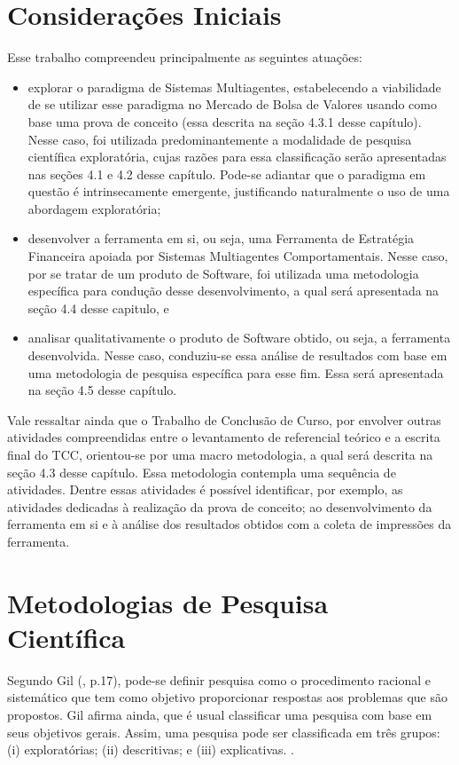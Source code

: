 \section{Considerações Iniciais}
Esse trabalho compreendeu principalmente as seguintes atuações:
\begin{itemize}
\item explorar o paradigma de Sistemas Multiagentes, estabelecendo a viabilidade de se utilizar esse paradigma no Mercado de Bolsa de Valores usando como base uma prova de conceito (essa descrita na seção 4.3.1 desse capítulo). Nesse caso, foi utilizada predominantemente a modalidade de pesquisa científica exploratória, cujas razões para essa classificação serão apresentadas nas seções 4.1 e 4.2 desse capítulo. Pode-se adiantar que o paradigma em questão é intrinsecamente emergente, justificando naturalmente o uso de uma abordagem exploratória;

\item desenvolver a ferramenta em si, ou seja, uma Ferramenta de Estratégia Financeira apoiada por Sistemas Multiagentes Comportamentais. Nesse caso, por se tratar de um produto de Software, foi utilizada uma metodologia específica para condução desse desenvolvimento, a qual será apresentada na seção 4.4 desse capitulo, e

\item analisar qualitativamente o produto de Software obtido, ou seja, a ferramenta desenvolvida. Nesse caso, conduziu-se essa análise de resultados com base em uma metodologia de pesquisa específica para esse fim. Essa será apresentada na seção 4.5 desse capítulo.
\end{itemize}

Vale ressaltar ainda que o Trabalho de Conclusão de Curso, por envolver outras atividades compreendidas entre o levantamento de referencial teórico e a escrita final do TCC, orientou-se por uma macro metodologia, a qual será descrita na seção 4.3 desse capítulo. Essa metodologia contempla uma sequência de atividades. Dentre essas atividades é possível identificar, por exemplo, as atividades dedicadas à realização da prova de conceito; ao desenvolvimento da ferramenta em si e à análise dos resultados obtidos com a coleta de impressões da ferramenta.

\section{Metodologias de Pesquisa Científica}

Segundo Gil (\citeyear{gil2002}, p.17), pode-se definir pesquisa como o procedimento racional e sistemático que tem como objetivo proporcionar respostas aos problemas que são propostos. Gil afirma ainda, que é usual classificar uma pesquisa com base em seus objetivos gerais. Assim, uma pesquisa pode ser classificada em três grupos: (i) exploratórias; (ii) descritivas; e (iii) explicativas. \cite[p. 41]{gil2002}.

